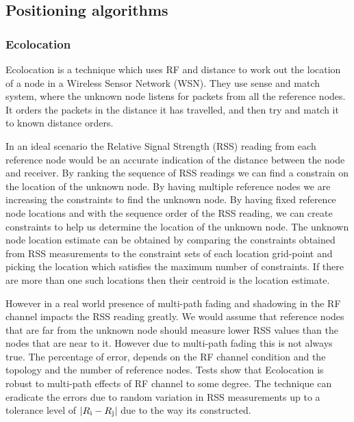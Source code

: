 
\subsection{Positioning algorithms}


\subsubsection{Ecolocation} \label{ecolocation}

Ecolocation\cite{Ecolocation} is a technique which uses RF and distance
to work out the location of a node in a Wireless Sensor Network (WSN).
They use sense and match system, where the unknown node listens for
packets from all the reference nodes. It orders the packets in the
distance it has travelled, and then try and match it to known distance
orders. 

In an ideal scenario the Relative Signal Strength (RSS) reading from
each reference node would be an accurate indication of the distance
between the node and receiver. By ranking the sequence of RSS readings we can
find a constrain on the location of the unknown node. By having multiple
reference nodes we are increasing the constraints to find the unknown
node. By having fixed reference node locations and with the sequence order
of the RSS reading, we can create constraints to help us determine the location of the unknown
node. The unknown node location estimate can be obtained
by comparing the constraints obtained from RSS measurements to the
constraint sets of each location grid-point and picking the location
which satisfies the maximum number of constraints. If there are more
than one such locations then their centroid is the location estimate.

However in a real world presence of multi-path fading and shadowing
in the RF channel impacts the RSS reading greatly. We would assume
that reference nodes that are far from the unknown node should measure
lower RSS values than the nodes that are near to it. However due to
multi-path fading this is not always true. The percentage of error,
depends on the RF channel condition and the topology and the number
of reference nodes. Tests show that Ecolocation is robust to multi-path
effects of RF channel to some degree. The technique can eradicate
the errors due to random variation in RSS measurements up to a tolerance
level of $|R \textsubscript{i}-R \textsubscript{j}| $
due to the way
its constructed.

